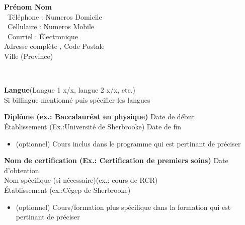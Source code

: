 \documentclass[twoside,letterpaper,12pt]{article}
\begin{document}
\begin{center}
{\large \textbf{Prénom Nom}}\\
\Telefon \, Téléphone : Numeros Domicile\\
\Mobilefone \, Cellulaire : Numeros Mobile\\
\Letter \, Courriel : Électronique\\
Adresse complète , Code Postale\\
Ville (Province)\\
\end{center}

\bigbreak

\begin{flushleft}

\bigbreak

{\large \textbf{}}\\

\bigbreak 

\textbf{Langue}(Langue 1 x/x, langue 2 x/x, etc.)\\ Si billingue mentionné puis spécifier les langues

\bigbreak

\textbf{Diplôme (ex.: Baccalauréat en physique)} \hfill Date de début\\
Établissement (Ex.:Université de Sherbrooke) \hfill Date de fin \\
\begin{itemize}[label=\textbullet, font=  \scriptsize]
    \item (optionnel) Cours inclus dans le programme qui est pertinant de préciser
\end{itemize}

\bigbreak

\textbf{Nom de  certification (Ex.: Certification de premiers soins)} \hfill Date d'obtention \\
Nom spécifique (si nécessaire)(ex.: cours de RCR) \\
Établissement (ex.:Cégep de Sherbrooke)\\
\begin{itemize}[label=\textbullet, font=  \scriptsize]
    \item (optionnel) Cours/formation plus spécifique dans la formation qui est pertinant de préciser\\
\end{itemize}

\bigbreak

{\large \textbf{}}


\end{flushleft}
\end{document}
